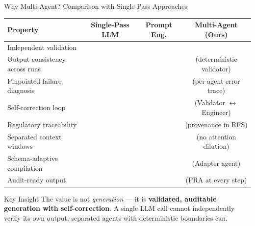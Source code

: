 \documentclass[10pt, aspectratio=169]{beamer}
\newcommand{\cmark}{\textcolor{accentgreen}{\checkmark}}
\newcommand{\xmark}{\textcolor{accentred}{\texttimes}}
\begin{document}
\begin{frame}{Why Multi-Agent? Comparison with Single-Pass Approaches}

\begin{center}
\scriptsize
\begin{tabular}{p{4.2cm}ccc}
  \toprule
  \textbf{Property} & \textbf{Single-Pass LLM} & \textbf{Prompt Eng.} & \textbf{Multi-Agent (Ours)} \\
  \midrule
  Independent validation & \xmark & \xmark & \cmark \\
  Output consistency across runs & \xmark & \xmark & \cmark\;(deterministic validator) \\
  Pinpointed failure diagnosis & \xmark & \xmark & \cmark\;(per-agent error trace) \\
  Self-correction loop & \xmark & \xmark & \cmark\;(Validator $\leftrightarrow$ Engineer) \\
  Regulatory traceability & \xmark & \xmark & \cmark\;(provenance in RFS) \\
  Separated context windows & \xmark & \xmark & \cmark\;(no attention dilution) \\
  Schema-adaptive compilation & \xmark & \xmark & \cmark\;(Adapter agent) \\
  Audit-ready output & \xmark & \xmark & \cmark\;(PRA at every step) \\
  \bottomrule
\end{tabular}
\end{center}

\vspace{0.5em}
\begin{alertblock}{Key Insight}
  \small The value is not \textit{generation} --- it is \textbf{validated, auditable generation with self-correction}. A single LLM call cannot independently verify its own output; separated agents with deterministic boundaries can.
\end{alertblock}
\end{frame}
\end{document}
